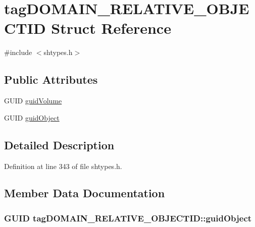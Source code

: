 \hypertarget{structtag_d_o_m_a_i_n___r_e_l_a_t_i_v_e___o_b_j_e_c_t_i_d}{}\section{tag\+D\+O\+M\+A\+I\+N\+\_\+\+R\+E\+L\+A\+T\+I\+V\+E\+\_\+\+O\+B\+J\+E\+C\+T\+ID Struct Reference}
\label{structtag_d_o_m_a_i_n___r_e_l_a_t_i_v_e___o_b_j_e_c_t_i_d}


{\ttfamily \#include $<$shtypes.\+h$>$}

\subsection*{Public Attributes}
\begin{DoxyCompactItemize}
\item 
G\+U\+ID \hyperlink{structtag_d_o_m_a_i_n___r_e_l_a_t_i_v_e___o_b_j_e_c_t_i_d_a1d9c9ff43609cdf1b4d602c22bc9ced3}{guid\+Volume}
\item 
G\+U\+ID \hyperlink{structtag_d_o_m_a_i_n___r_e_l_a_t_i_v_e___o_b_j_e_c_t_i_d_a30dfd0c8c5e6b1ca3e1b7738a8eafb74}{guid\+Object}
\end{DoxyCompactItemize}


\subsection{Detailed Description}


Definition at line 343 of file shtypes.\+h.



\subsection{Member Data Documentation}
\subsubsection[{\texorpdfstring{guid\+Object}{guidObject}}]{\setlength{\rightskip}{0pt plus 5cm}G\+U\+ID tag\+D\+O\+M\+A\+I\+N\+\_\+\+R\+E\+L\+A\+T\+I\+V\+E\+\_\+\+O\+B\+J\+E\+C\+T\+I\+D\+::guid\+Object}\hypertarget{structtag_d_o_m_a_i_n___r_e_l_a_t_i_v_e___o_b_j_e_c_t_i_d_a30dfd0c8c5e6b1ca3e1b7738a8eafb74}{}\label{structtag_d_o_m_a_i_n___r_e_l_a_t_i_v_e___o_b_j_e_c_t_i_d_a30dfd0c8c5e6b1ca3e1b7738a8eafb74}


